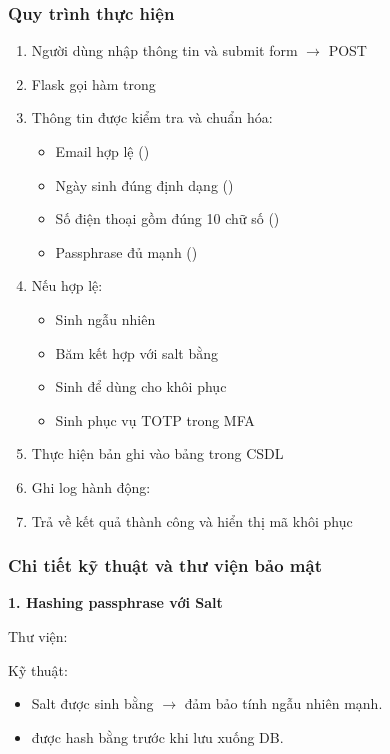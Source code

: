 \subsubsection*{Quy trình thực hiện}
\begin{enumerate}
    \item Người dùng nhập thông tin và submit form $\rightarrow$ POST 
    \item Flask gọi hàm  trong 
    \item Thông tin được kiểm tra và chuẩn hóa:
    \begin{itemize}
        \item Email hợp lệ ()
        \item Ngày sinh đúng định dạng ()
        \item Số điện thoại gồm đúng 10 chữ số () 
        \item Passphrase đủ mạnh ()
    \end{itemize}
    \item Nếu hợp lệ:
    \begin{itemize}
        \item Sinh  ngẫu nhiên
        \item Băm  kết hợp với salt bằng 
        \item Sinh  để dùng cho khôi phục
        \item Sinh  phục vụ TOTP trong MFA
    \end{itemize}
    \item Thực hiện  bản ghi vào bảng  trong CSDL
    \item Ghi log hành động: 
    \item Trả về kết quả thành công và hiển thị mã khôi phục
\end{enumerate}

\subsubsection*{Chi tiết kỹ thuật và thư viện bảo mật}
\textbf{1. Hashing passphrase với Salt}

Thư viện:  

Kỹ thuật:
\begin{itemize}
    \item Salt được sinh bằng  $\rightarrow$ đảm bảo tính ngẫu nhiên mạnh.
    \item {} được hash bằng  trước khi lưu xuống DB.
\end{itemize}

